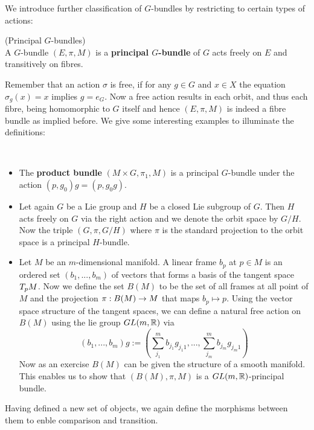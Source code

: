 We introduce further classification of $G$-bundles by restricting to certain types of actions:

\begin{definition} (Principal $G$-bundles)\\
  A $G$-bundle $(E,\pi,M)$ is a \textbf{principal $G$-bundle} of $G$ acts freely on $E$ and transitively on fibres.
\end{definition}

Remember that an action $\sigma$ is free, if for any $g\in G$ and $x\in X$ the equation $\sigma_g(x) = x$ implies $g = e_G$. Now a free action results in each orbit, and thus each fibre, being homomorphic to $G$ itself and hence $(E,\pi,M)$ is indeed a fibre bundle as implied before. We give some interesting examples to illuminate the definitions:

\begin{example}~
\begin{itemize}
  \item The \textbf{product bundle} $(M\times G, \pi_1, M)$ is a principal $G$-bundle under the action $(p, g_0)g = (p, g_0 g)$.

  \item Let again $G$ be a Lie group and $H$ be a closed Lie subgroup of $G$. Then $H$ acts freely on $G$ via the right action and we denote the orbit space by $G/H$. Now the triple $(G,\pi, G/H)$ where $\pi$ is the standard projection to the orbit space is a principal $H$-bundle.

  \item Let $M$ be an $m$-dimensional manifold. A linear frame $b_p$ at $p\in M$ is an ordered set $(b_1, ..., b_m)$ of vectors that forms a basis of the tangent space $T_p M$. Now we define the set $B(M)$ to be the set of all frames at all point of $M$ and the projection $\pi:B(M)\rightarrow M$ that maps $b_p \mapsto p$. Using the vector space structure of the tangent spaces, we can define a natural free action on $B(M)$ using the lie group $GL(m,\mathbb{R})$ via
  $$ (b_1, ...,b_m)g := \left( \sum_{j_1}^m b_{j_1} g_{j_1 1}, ..., \sum_{j_m}^m b_{j_m} g_{j_m 1} \right) $$
  Now as an exercise $B(M)$ can be given the structure of a smooth manifold. This enables us to show that $(B(M), \pi, M)$ is a $GL(m,\mathbb{R})$-principal bundle.
\end{itemize}
\end{example}

Having defined a new set of objects, we again define the morphisms between them to enble comparison and transition.

